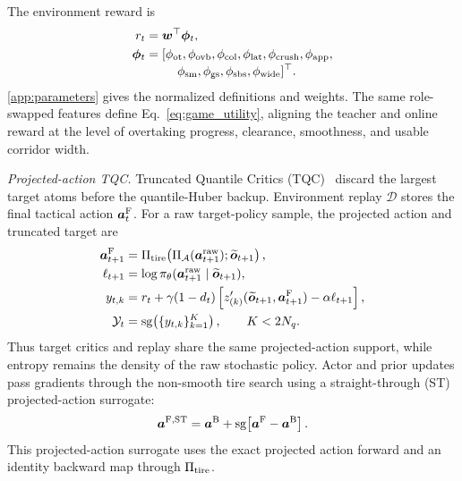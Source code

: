 \documentclass[journal,twoside,web]{ieeecolor}
\begin{document}
The environment reward is
\begin{equation}
\begin{aligned}
r_t&=\bm w^\top\bm\phi_t,\\
\bm\phi_t&=[\phi_{\rm ot},\phi_{\rm ovb},\phi_{\rm col},\phi_{\rm lat},
\phi_{\rm crush},\phi_{\rm app},\\[-1mm]
&\hspace{9mm}\phi_{\rm sm},\phi_{\rm gs},\phi_{\rm sbs},
\phi_{\rm wide}]^\top .
\end{aligned}
\label{eq:reward_sum}
\end{equation}
\ref{app:parameters} gives the normalized definitions and weights.
The same role-swapped features define Eq.~\eqref{eq:game_utility}, aligning the
teacher and online reward at the level of overtaking progress, clearance,
smoothness, and usable corridor width.

\emph{Projected-action TQC.} Truncated Quantile Critics
(TQC)~\cite{kuznetsov2020tqc} discard the largest
target atoms before the quantile-Huber backup. Environment replay $\mathcal D$
stores the final tactical action $\bm a_t^{\rm F}$. For a raw target-policy
sample, the projected action and truncated target are
\begin{equation}
\begin{aligned}
\bm a_{t+1}^{\rm F}&=\Pi_{\rm tire}\!\left(
\Pi_{\mathcal A}(\bm a_{t+1}^{\rm raw});
\widetilde{\bm o}_{t+1}\right),\\
\ell_{t+1}&=\log\pi_\theta(\bm a_{t+1}^{\rm raw}
\mid\widetilde{\bm o}_{t+1}),\\
y_{t,k}&=r_t+\gamma(1-d_t)
\left[z_{(k)}'(\widetilde{\bm o}_{t+1},\bm a_{t+1}^{\rm F})
-\alpha\ell_{t+1}\right],\\
\mathcal Y_t&=\operatorname{sg}\!\left(\{y_{t,k}\}_{k=1}^{K}\right),
\qquad K<2N_q .
\end{aligned}
\label{eq:tqc_truncated_target}
\end{equation}
Thus target critics and replay share the same projected-action support, while
entropy remains the density of the raw stochastic policy. Actor and prior
updates pass gradients through the non-smooth tire search using a
straight-through (ST) projected-action surrogate:
\begin{equation}
\bm a^{\rm F,ST}=\bm a^{\rm B}
+\operatorname{sg}\!\left[\bm a^{\rm F}-\bm a^{\rm B}\right].
\label{eq:tire_projection_ste}
\end{equation}
This projected-action surrogate uses the exact projected action forward and an
identity backward map through $\Pi_{\rm tire}$.
\end{document}

